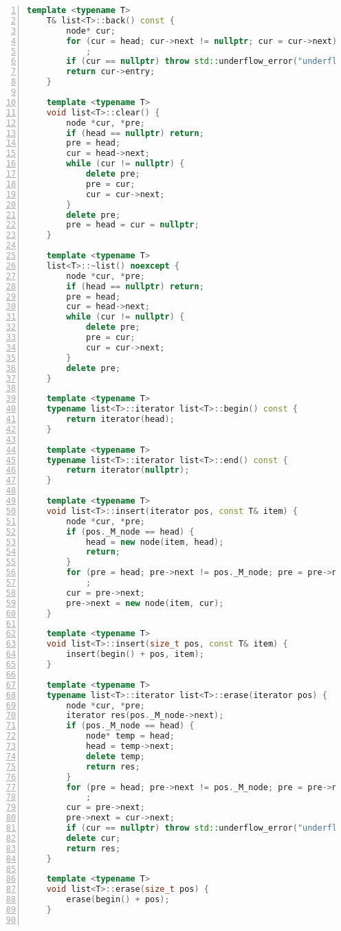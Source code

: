 \documentclass{article}
\begin{document}
\begin{lstlisting}[xleftmargin = 2em,xrightmargin = 2em, aboveskip = 0.5em, numbers = left, language = C++]
    template <typename T>
    T& list<T>::back() const {
        node* cur;
        for (cur = head; cur->next != nullptr; cur = cur->next)
            ;
        if (cur == nullptr) throw std::underflow_error("underflow");
        return cur->entry;
    }

    template <typename T>
    void list<T>::clear() {
        node *cur, *pre;
        if (head == nullptr) return;
        pre = head;
        cur = head->next;
        while (cur != nullptr) {
            delete pre;
            pre = cur;
            cur = cur->next;
        }
        delete pre;
        pre = head = cur = nullptr;
    }

    template <typename T>
    list<T>::~list() noexcept {
        node *cur, *pre;
        if (head == nullptr) return;
        pre = head;
        cur = head->next;
        while (cur != nullptr) {
            delete pre;
            pre = cur;
            cur = cur->next;
        }
        delete pre;
    }

    template <typename T>
    typename list<T>::iterator list<T>::begin() const {
        return iterator(head);
    }

    template <typename T>
    typename list<T>::iterator list<T>::end() const {
        return iterator(nullptr);
    }

    template <typename T>
    void list<T>::insert(iterator pos, const T& item) {
        node *cur, *pre;
        if (pos._M_node == head) {
            head = new node(item, head);
            return;
        }
        for (pre = head; pre->next != pos._M_node; pre = pre->next)
            ;
        cur = pre->next;
        pre->next = new node(item, cur);
    }

    template <typename T>
    void list<T>::insert(size_t pos, const T& item) {
        insert(begin() + pos, item);
    }

    template <typename T>
    typename list<T>::iterator list<T>::erase(iterator pos) {
        node *cur, *pre;
        iterator res(pos._M_node->next);
        if (pos._M_node == head) {
            node* temp = head;
            head = temp->next;
            delete temp;
            return res;
        }
        for (pre = head; pre->next != pos._M_node; pre = pre->next)
            ;
        cur = pre->next;
        pre->next = cur->next;
        if (cur == nullptr) throw std::underflow_error("underflow");
        delete cur;
        return res;
    }

    template <typename T>
    void list<T>::erase(size_t pos) {
        erase(begin() + pos);
    }


\end{lstlisting}
\end{document}
